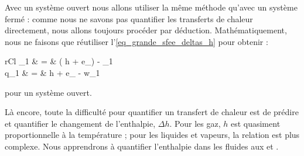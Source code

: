 	Avec un système ouvert nous allons utiliser la même méthode qu’avec un système fermé : comme nous ne savons pas quantifier les transferts de chaleur directement, nous allons toujours procéder par déduction.
	Mathématiquement, nous ne faisons que réutiliser l’\cref{eq_grande_sfee_deltas_h} pour obtenir :
	\begin{IEEEeqnarray}{rCl}
		_{1 } & = &  \left( \Delta h + \Delta e_\right) - _{1 } \\
			q_{1 } 	& = & \Delta h + \Delta e_  - w_{1 }
	\end{IEEEeqnarray}
	\begin{equationterms}
		\item pour un système ouvert.
	\end{equationterms}
		
		Là encore, toute la difficulté pour quantifier un transfert de chaleur est de prédire et quantifier le changement de l’enthalpie, $\Delta h$. Pour les gaz, $h$ est quasiment proportionnelle à la température ; pour les liquides et vapeurs, la relation est plus complexe. Nous apprendrons à quantifier l’enthalpie dans les fluides aux \coursquatre et \courscinq.
